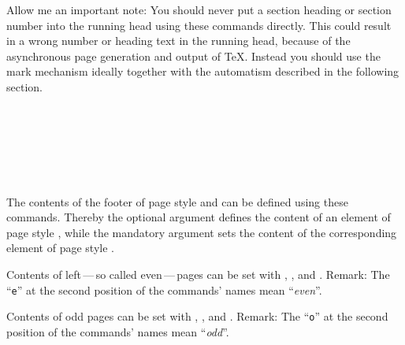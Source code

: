 Allow me an important note: You should never put a
section heading or section number into the running head using these commands
directly. This could result in a wrong number or heading text in the running
head, because of the asynchronous page generation and output of \TeX. Instead
you should use the mark mechanism ideally together with the automatism
described in the following section.%
%
%
%
%
%
%

\begin{Declaration}
                \\
                \\
                \\
                \\
                \\
\end{Declaration}
%
%
%
%
%
%
The contents of the footer of page style  and
 can be defined using these commands. Thereby the
optional argument defines the content of an element of page style
, while the mandatory argument sets the content
of the corresponding element of page style .

Contents of left\,---\,so called even\,---\,pages can be set with
, , and . Remark: The ``\texttt{e}''
at the second position of the commands' names mean ``\emph{even}''.

Contents of odd pages can be set with , , and
. Remark: The ``\texttt{o}'' at the second position of the
commands' names mean ``\emph{odd}''.

